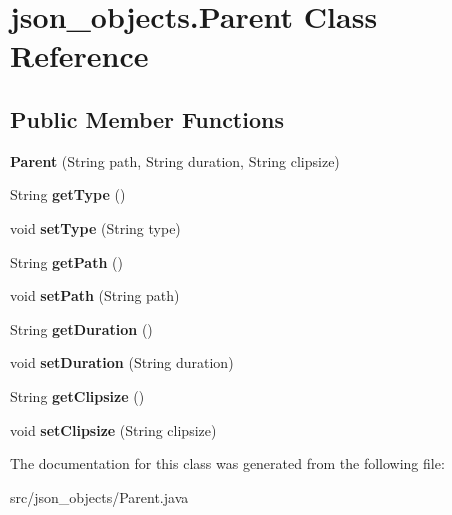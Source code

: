 \hypertarget{classjson__objects_1_1_parent}{
\section{json\_\-objects.Parent Class Reference}
\label{classjson__objects_1_1_parent}
}
\subsection*{Public Member Functions}
\begin{DoxyCompactItemize}
\item 
\hypertarget{classjson__objects_1_1_parent_af87a135d30219aa1445dabf5e8518fb5}{
{\bfseries Parent} (String path, String duration, String clipsize)}
\label{classjson__objects_1_1_parent_af87a135d30219aa1445dabf5e8518fb5}

\item 
\hypertarget{classjson__objects_1_1_parent_a742607ca28dfc8c9ecd9c341e463d099}{
String {\bfseries getType} ()}
\label{classjson__objects_1_1_parent_a742607ca28dfc8c9ecd9c341e463d099}

\item 
\hypertarget{classjson__objects_1_1_parent_ae894c3ed6dc5c57cedc954eaa903571e}{
void {\bfseries setType} (String type)}
\label{classjson__objects_1_1_parent_ae894c3ed6dc5c57cedc954eaa903571e}

\item 
\hypertarget{classjson__objects_1_1_parent_ace785f9757976f840a3fa89c9ed73413}{
String {\bfseries getPath} ()}
\label{classjson__objects_1_1_parent_ace785f9757976f840a3fa89c9ed73413}

\item 
\hypertarget{classjson__objects_1_1_parent_a0b675d6a6c580fc186d36c1281158cfd}{
void {\bfseries setPath} (String path)}
\label{classjson__objects_1_1_parent_a0b675d6a6c580fc186d36c1281158cfd}

\item 
\hypertarget{classjson__objects_1_1_parent_afcc8fae9132c91584e026091cb75f338}{
String {\bfseries getDuration} ()}
\label{classjson__objects_1_1_parent_afcc8fae9132c91584e026091cb75f338}

\item 
\hypertarget{classjson__objects_1_1_parent_ab66b6e0a47fb7fcc1f965421b875c142}{
void {\bfseries setDuration} (String duration)}
\label{classjson__objects_1_1_parent_ab66b6e0a47fb7fcc1f965421b875c142}

\item 
\hypertarget{classjson__objects_1_1_parent_ac4101220aa3006511498fb34165cc46f}{
String {\bfseries getClipsize} ()}
\label{classjson__objects_1_1_parent_ac4101220aa3006511498fb34165cc46f}

\item 
\hypertarget{classjson__objects_1_1_parent_a37bfe377e806fa3a66dc3e1045b2a286}{
void {\bfseries setClipsize} (String clipsize)}
\label{classjson__objects_1_1_parent_a37bfe377e806fa3a66dc3e1045b2a286}

\end{DoxyCompactItemize}


The documentation for this class was generated from the following file:\begin{DoxyCompactItemize}
\item 
src/json\_\-objects/Parent.java\end{DoxyCompactItemize}
